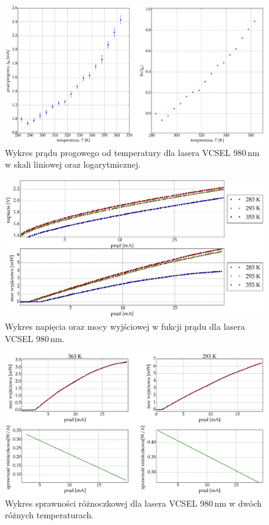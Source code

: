 \begin{figure}
\center
  \includegraphics[scale=0.30]{plot980/plot_temp_i_th_log_lin.eps}
  \caption{Wykres prądu progowego od temperatury dla lasera VCSEL 980\,nm w skali liniowej oraz logarytmicznej.}
  \label{fig:plot_temp_i_th_log_lin_980}
\end{figure}
\begin{figure}
\center
  \includegraphics[scale=0.30]{plot980/plot_i_v_i_l.eps}
  \caption{Wykres napięcia oraz mocy wyjściowej w fukcji prądu dla lasera VCSEL 980\,nm.}
  \label{fig:plot_i_v_i_l_980}
\end{figure}
\begin{figure}
\center
  \includegraphics[scale=0.30]{plot980/plot_eff_via_current4.eps}
  \caption{Wykres sprawności różnoczkowej dla lasera VCSEL 980\,nm w dwóch różnych temperaturach.}
  \label{fig:plot_eff_via_current4_980}
\end{figure}
